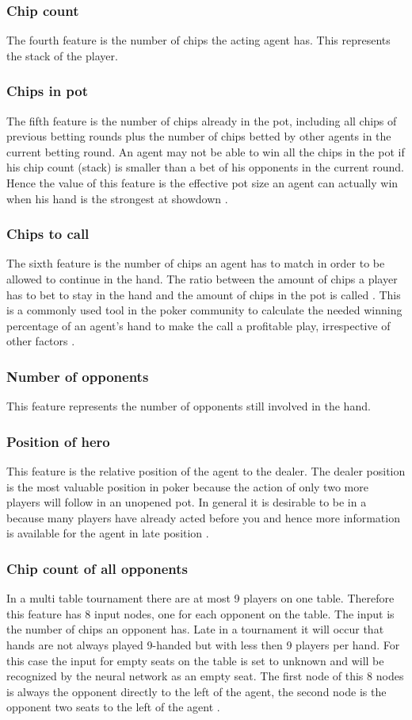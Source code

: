 \subsubsection{Chip count}
The fourth feature is the number of chips the acting agent has. This represents the stack of the player. 
\subsubsection{Chips in pot}
The fifth feature is the number of chips already in the pot, including all chips of previous betting rounds plus the number of chips betted by other agents in the current betting round. An agent may not be able to win all the chips in the pot if his chip count (stack) is smaller than a bet of his opponents in the current round. Hence the value of this feature is the effective pot size an agent can actually win when his hand is the strongest at showdown \cite{evolutionary_methods}.
\subsubsection{Chips to call}
The sixth feature is the number of chips an agent has to match in order to be allowed to continue in the hand. 
The ratio between the amount of chips a player has to bet to stay in the hand and the amount of chips in the pot is called . This is a commonly used tool in the poker community to calculate the needed winning percentage of an agent's hand to make the call a profitable play, irrespective of other factors \cite{evolutionary_methods}.
\subsubsection{Number of opponents}
This feature represents the number of opponents still involved in the hand.
\subsubsection{Position of hero}
This feature is the relative position of the agent to the dealer. The dealer position is the most valuable position in poker because the action of only two more players will follow in an unopened pot. In general it is desirable to be in a  because many players have already acted before you and hence more information is available for the agent in late position \cite{evolutionary_methods}.
\subsubsection{Chip count of all opponents}
In a  multi table tournament there are at most 9 players on one table. Therefore this feature has 8 input nodes, one for each opponent on the table. The input is the number of chips an opponent has. Late in a tournament it will occur that hands are not always played 9-handed but with less then 9 players per hand. For this case the input for empty seats on the table is set to unknown and will be recognized by the neural network as an empty seat. The first node of this 8 nodes is always the opponent directly to the left of the agent, the second node is the opponent two seats to the left of the agent \cite{evolutionary_methods}. 

